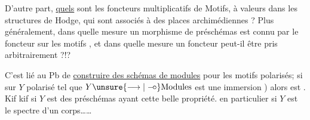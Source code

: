D'autre part, \uline{quels} sont les foncteurs multiplicatifs de Motifs, à valeurs dans les structures de Hodge,  qui sont associés à des places archimédiennes ? Plus généralement, dans quelle mesure un morphisme de préschémas  est connu par le foncteur sur les motifs , et dans quelle mesure un foncteur  peut-il être pris arbitrairement ?!?

C'est lié au Pb de \uline{construire des schémas de modules} pour les motifs polarisés; si sur $Y$  polarisé  tel que $Y\unsure{\longrightarrow|\mathrel{-\!\circ}}\text{Modules}$ est une immersion )  alors est . Kif kif si $Y$ est \uline{} des préschémas ayant cette belle propriété.  en particulier si $Y$ est le spectre d'un corps\ldots\ldots
{}
